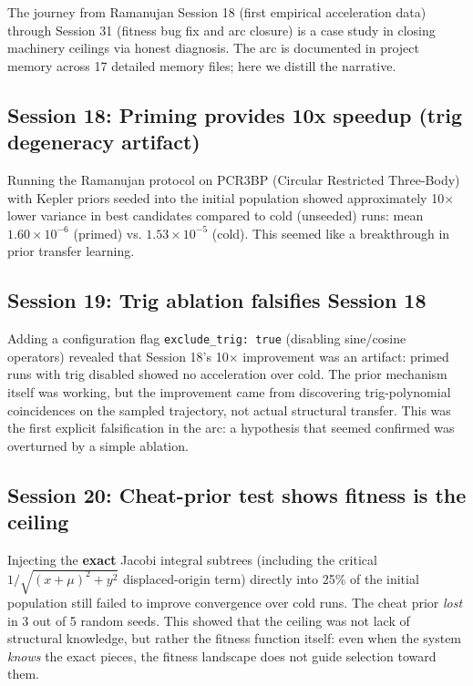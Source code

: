 The journey from Ramanujan Session 18 (first empirical acceleration data) through Session 31 (fitness bug fix and arc closure) is a case study in closing machinery ceilings via honest diagnosis. The arc is documented in project memory across 17 detailed memory files; here we distill the narrative.

\subsection{Session 18: Priming provides 10x speedup (trig degeneracy artifact)}

Running the Ramanujan protocol on PCR3BP (Circular Restricted Three-Body) with Kepler priors seeded into the initial population showed approximately 10× lower variance in best candidates compared to cold (unseeded) runs: mean $1.60 \times 10^{-6}$ (primed) vs. $1.53 \times 10^{-5}$ (cold). This seemed like a breakthrough in prior transfer learning.

\subsection{Session 19: Trig ablation falsifies Session 18}

Adding a configuration flag \texttt{exclude\_trig: true} (disabling sine/cosine operators) revealed that Session 18's 10$\times$ improvement was an artifact: primed runs with trig disabled showed no acceleration over cold. The prior mechanism itself was working, but the improvement came from discovering trig-polynomial coincidences on the sampled trajectory, not actual structural transfer. This was the first explicit falsification in the arc: a hypothesis that seemed confirmed was overturned by a simple ablation.

\subsection{Session 20: Cheat-prior test shows fitness is the ceiling}

Injecting the \textbf{exact} Jacobi integral subtrees (including the critical $1/\sqrt{(x+\mu)^2 + y^2}$ displaced-origin term) directly into 25\% of the initial population still failed to improve convergence over cold runs. The cheat prior \textit{lost} in 3 out of 5 random seeds. This showed that the ceiling was not lack of structural knowledge, but rather the fitness function itself: even when the system \textit{knows} the exact pieces, the fitness landscape does not guide selection toward them.

